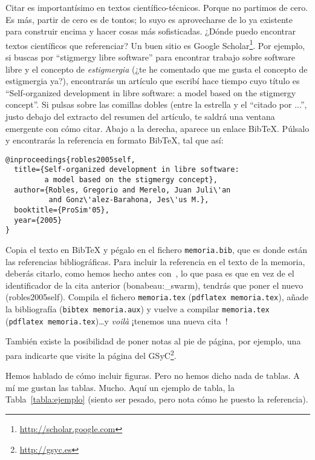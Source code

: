 \documentclass[a4paper, 12pt]{book}
\begin{document}
Citar es importantísimo en textos científico-técnicos. 
Porque no partimos de cero.
Es más, partir de cero es de tontos; lo suyo es aprovecharse de lo ya existente para construir encima y hacer cosas más sofisticadas.
¿Dónde puedo encontrar textos científicos que referenciar?
Un buen sitio es Google Scholar\footnote{\url{http://scholar.google.com}}.
Por ejemplo, si buscas por ``stigmergy libre software'' para encontrar trabajo sobre software libre y el concepto de \emph{estigmergia} (¿te he comentado que me gusta el concepto de estigmergia ya?), encontrarás un artículo que escribí hace tiempo cuyo título es ``Self-organized development in libre software: a model based on the stigmergy concept''.
Si pulsas sobre las comillas dobles (entre la estrella y el ``citado por ...'', justo debajo del extracto del resumen del artículo, te saldrá una ventana emergente con cómo citar.
Abajo a la derecha, aparece un enlace BibTeX.
Púlsalo y encontrarás la referencia en formato BibTeX, tal que así:

{\footnotesize
\begin{verbatim}
@inproceedings{robles2005self,
  title={Self-organized development in libre software:
         a model based on the stigmergy concept},
  author={Robles, Gregorio and Merelo, Juan Juli\'an 
          and Gonz\'alez-Barahona, Jes\'us M.},
  booktitle={ProSim'05},
  year={2005}
}
\end{verbatim}
}

Copia el texto en BibTeX y pégalo en el fichero \texttt{memoria.bib}, que es donde están las referencias bibliográficas.
Para incluir la referencia en el texto de la memoria, deberás citarlo, como hemos hecho antes con~\cite{bonabeau:_swarm}, lo que pasa es que en vez de el identificador de la cita anterior (bonabeau:\_swarm), tendrás que poner el nuevo (robles2005self).
Compila el fichero \texttt{memoria.tex} (\texttt{pdflatex memoria.tex}), añade la bibliografía (\texttt{bibtex memoria.aux}) y vuelve a compilar \texttt{memoria.tex} (\texttt{pdflatex memoria.tex})\ldots y \emph{voilà} ¡tenemos una nueva cita~\cite{robles2005self}!

También existe la posibilidad de poner notas al pie de página, por ejemplo, una para indicarte que visite la página del GSyC\footnote{\url{http://gsyc.es}}.



Hemos hablado de cómo incluir figuras.
Pero no hemos dicho nada de tablas.
A mí me gustan las tablas.
Mucho.
Aquí un ejemplo de tabla, la Tabla~\ref{tabla:ejemplo} (siento ser pesado, pero nota cómo he puesto la referencia).
\end{document}
